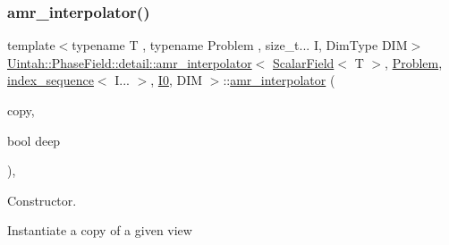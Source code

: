 \subsubsection{\texorpdfstring{amr\+\_\+interpolator()}{amr\_interpolator()}\hspace{0.1cm}{\footnotesize\ttfamily [1/4]}}
{\footnotesize\ttfamily template$<$typename T , typename Problem , size\+\_\+t... I, Dim\+Type D\+IM$>$ \\
\hyperlink{classUintah_1_1PhaseField_1_1detail_1_1amr__interpolator}{Uintah\+::\+Phase\+Field\+::detail\+::amr\+\_\+interpolator}$<$ \hyperlink{structUintah_1_1PhaseField_1_1ScalarField}{Scalar\+Field}$<$ T $>$, \hyperlink{classUintah_1_1PhaseField_1_1Problem}{Problem}, \hyperlink{namespaceUintah_1_1PhaseField_a237de804d99512e50613aff7c94a9461}{index\+\_\+sequence}$<$ I... $>$, \hyperlink{namespaceUintah_1_1PhaseField_a547ce3002aa97fbd3ef3192a6eec8406abdd8ebcbdfd71d1125937e3012dc45fb}{I0}, D\+IM $>$\+::\hyperlink{classUintah_1_1PhaseField_1_1detail_1_1amr__interpolator}{amr\+\_\+interpolator} (\begin{DoxyParamCaption}\item[{const \hyperlink{classUintah_1_1PhaseField_1_1detail_1_1amr__interpolator}{amr\+\_\+interpolator}$<$ \hyperlink{structUintah_1_1PhaseField_1_1ScalarField}{Scalar\+Field}$<$ T $>$, \hyperlink{classUintah_1_1PhaseField_1_1Problem}{Problem}, \hyperlink{namespaceUintah_1_1PhaseField_a237de804d99512e50613aff7c94a9461}{index\+\_\+sequence}$<$ I... $>$, \hyperlink{namespaceUintah_1_1PhaseField_a547ce3002aa97fbd3ef3192a6eec8406abdd8ebcbdfd71d1125937e3012dc45fb}{I0}, D\+IM $>$ $\ast$}]{copy,  }\item[{bool}]{deep }\end{DoxyParamCaption})\hspace{0.3cm}{\ttfamily [inline]}, {\ttfamily [protected]}}



Constructor. 

Instantiate a copy of a given view


